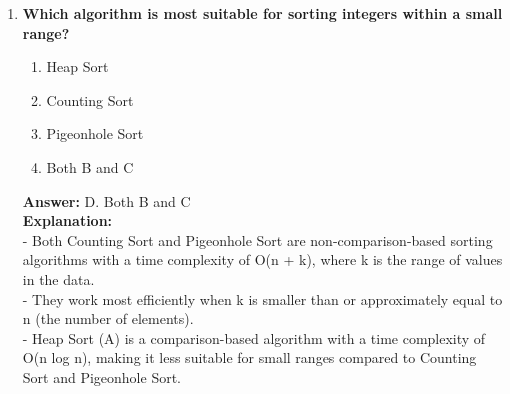 \begin{enumerate}
    \item \textbf{Which algorithm is most suitable for sorting integers within a small range?}
    \begin{enumerate}
        \item Heap Sort
        \item Counting Sort
        \item Pigeonhole Sort
        \item Both B and C
    \end{enumerate}
    \textbf{Answer:} D. Both B and C \\
    \textbf{Explanation:} \\
    - Both Counting Sort and Pigeonhole Sort are non-comparison-based sorting algorithms with a time complexity of O(n + k), where k is the range of values in the data. \\
    - They work most efficiently when k is smaller than or approximately equal to n (the number of elements). \\
    - Heap Sort (A) is a comparison-based algorithm with a time complexity of O(n log n), making it less suitable for small ranges compared to Counting Sort and Pigeonhole Sort.
\end{enumerate}